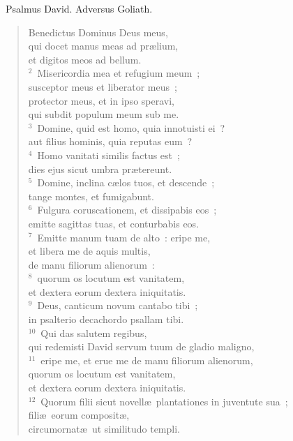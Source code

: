 ~\lettrine[lines=10,image=true,loversize=0.05,lraise=-0.03]{P}{}salmus David. Adversus Goliath. \begin{flushleft}\begin{verse}\vspace{6pt}Benedictus Dominus Deus meus,\\ qui docet manus meas ad pr\ae lium,\\ et digitos meos ad bellum.\\
${}^{2}$~Misericordia mea et refugium meum~;\\ susceptor meus et liberator meus~;\\ protector meus, et in ipso speravi,\\ qui subdit populum meum sub me.\\
${}^{3}$~Domine, quid est homo, quia innotuisti ei~?\\ aut filius hominis, quia reputas eum~?\\
${}^{4}$~Homo vanitati similis factus est~;\\ dies ejus sicut umbra pr\ae tereunt.\\
${}^{5}$~Domine, inclina c\ae los tuos, et descende~;\\ tange montes, et fumigabunt.\\
${}^{6}$~Fulgura coruscationem, et dissipabis eos~;\\ emitte sagittas tuas, et conturbabis eos.\\
${}^{7}$~Emitte manum tuam de alto~: eripe me,\\ et libera me de aquis multis,\\ de manu filiorum alienorum~:\\
${}^{8}$~quorum os locutum est vanitatem,\\ et dextera eorum dextera iniquitatis.\\
${}^{9}$~Deus, canticum novum cantabo tibi~;\\ in psalterio decachordo psallam tibi.\\
${}^{10}$~Qui das salutem regibus,\\ qui redemisti David servum tuum de gladio maligno,\\
${}^{11}$~eripe me, et erue me de manu filiorum alienorum,\\ quorum os locutum est vanitatem,\\ et dextera eorum dextera iniquitatis.\\
${}^{12}$~Quorum filii sicut novell\ae\ plantationes in juventute sua~;\\ fili\ae\ eorum composit\ae ,\\ circumornat\ae\ ut similitudo templi.\\

\end{verse}
\end{flushleft}
